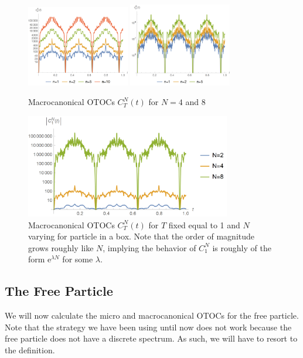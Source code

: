 \documentclass{article}
\newcommand{\e}{\mathrm{e}}
\begin{document}
\begin{figure}
\centering
\includegraphics[width=0.4\textwidth]{macrocanonicalwell4}
\includegraphics[width=0.4\textwidth]{macrocanonicalwell8}
\caption{Macrocanonical OTOCs $C_T^N(t)$ for $N = 4$ and 8}
\end{figure}
\begin{figure}
\centering
\includegraphics[width=0.8\textwidth]{macrocanonicalwellN}
\caption{Macrocanonical OTOCs $C_T^N(t)$ for $T$ fixed equal to 1 and $N$ varying for particle in a box. Note that the order of magnitude grows roughly like $N$, implying the behavior of $C_1^N$ is roughly of the form $\e^{\lambda N}$ for some $\lambda$.}
\end{figure}

\subsection{The Free Particle}

We will now calculate the micro and macrocanonical OTOCs for the free particle. Note that the strategy we have been using until now does not work because the free particle does not have a discrete spectrum. As such, we will have to resort to the definition.
\end{document}
